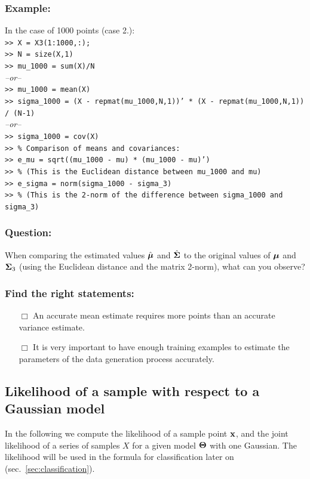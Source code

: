 \documentclass[a4paper]{article}
\newcommand{\mat}[1]{{\tt >> #1} \\}
\newcommand{\com}[1]{{\tt #1}}
\newcommand{\xv}{\ensuremath\mathbf{x}}  %
\newcommand{\muv}{\ensuremath\boldsymbol{\mu}}  %
\newcommand{\Sm}{\ensuremath\boldsymbol{\Sigma}}  %
\newcommand{\Tm}{\ensuremath\boldsymbol{\Theta}}  %
\begin{document}
\subsubsection{Example:}
In the case of 1000 points (case 2.): \\
\mat{X = X3(1:1000,:);}
\mat{N = size(X,1)}
\mat{mu\_1000 = sum(X)/N}
\textit{--or--}\\
\mat{mu\_1000 = mean(X)}
\mat{sigma\_1000 = (X - repmat(mu\_1000,N,1))' * (X - repmat(mu\_1000,N,1)) / (N-1)}
\textit{--or--}\\
\mat{sigma\_1000 = cov(X)}

\noindent
\mat{\% Comparison of means and covariances:}
\mat{e\_mu =  sqrt((mu\_1000 - mu) * (mu\_1000 - mu)')}
\mat{\% (This is the Euclidean distance between mu\_1000 and mu)}
\mat{e\_sigma = norm(sigma\_1000 - sigma\_3)}
\com{>> \% (This is the 2-norm of the difference between sigma\_1000 and sigma\_3)}

\subsubsection{Question:}
When comparing the estimated values $\hat{\muv}$ and $\hat{\Sm}$ to
the original values of $\muv$ and $\Sm_3$ (using the Euclidean
distance and the matrix 2-norm), what can you observe?

\subsubsection*{Find the right statements:}
\begin{itemize}
\item[$\Box$] An accurate mean estimate requires more points than an
  accurate variance estimate.
\item[$\Box$] It is very important to have enough training examples to
  estimate the parameters of the data generation process accurately.
\end{itemize}



\subsection{Likelihood of a sample with respect to a Gaussian model}
\label{sec:likelihood}

In the following we compute the likelihood of a sample point $\xv$,
and the joint likelihood of a series of samples $X$ for a given model
$\Tm$ with one Gaussian.  The likelihood will be used in the formula
for classification later on (sec.~\ref{sec:classification}).
\end{document}
